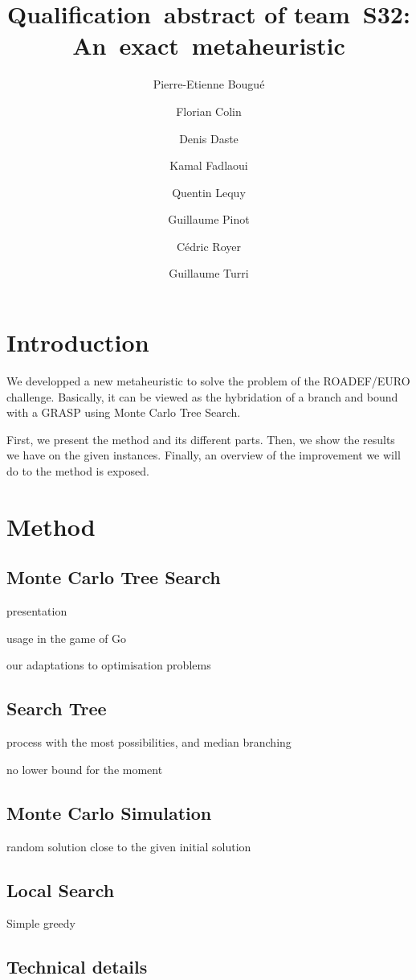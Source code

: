 \documentclass[a4paper,twocolumn]{article}
\title{Qualification~abstract of team~S32:
  An~exact~metaheuristic}
\author{Pierre-Etienne Bougué \and Florian Colin \and Denis Daste
  \and Kamal Fadlaoui \and Quentin Lequy \and Guillaume Pinot \and
  Cédric Royer \and Guillaume Turri}
\begin{document}
\maketitle

\section{Introduction}

We developped a new metaheuristic to solve the problem of the
ROADEF/EURO challenge.  Basically, it can be viewed as the hybridation
of a branch and bound with a GRASP using Monte Carlo Tree Search.

First, we present the method and its different parts.  Then, we show
the results we have on the given instances. Finally, an overview of
the improvement we will do to the method is exposed.

\section{Method}

\subsection{Monte Carlo Tree Search}

presentation

usage in the game of Go

our adaptations to optimisation problems

\subsection{Search Tree}

process with the most possibilities, and median branching

no lower bound for the moment

\subsection{Monte Carlo Simulation}

random solution close to the given initial solution

\subsection{Local Search}

Simple greedy

\subsection{Technical details}
\end{document}
